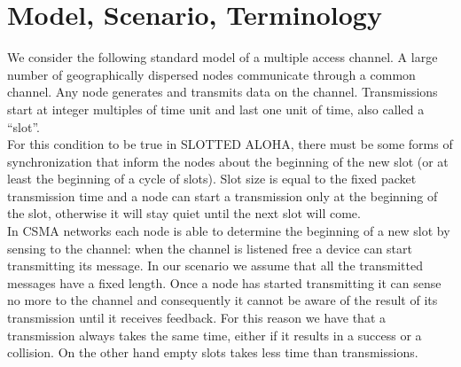 \documentclass[12pt,a4paper]{report}
\begin{document}

\section{Model, Scenario, Terminology}

We consider the following standard model of a multiple access channel. A large number of geographically dispersed nodes communicate through a common channel. Any node generates and transmits data on the channel. Transmissions start at integer multiples of  time unit and last one unit of time, also called a ``slot''.\\

For this condition to be true in SLOTTED ALOHA, there must be some forms of synchronization that inform the nodes about the beginning of the new slot (or at least the beginning of a cycle of slots). Slot size is equal to the fixed packet transmission time and a node can start a transmission only at the beginning of the slot, otherwise it will stay quiet until the next slot will come.\\

In CSMA networks each node is able to determine the beginning of a new slot by sensing to the channel: when the channel is listened free a device can start transmitting its message. In our scenario we assume that all the transmitted messages have a fixed length. Once a node has started transmitting it can sense no more to the channel and consequently it cannot be aware of the result of its transmission until it receives feedback. For this reason we have that a transmission always takes the same time, either if  it results in a success or a collision. On the other hand empty slots takes less time than transmissions.\\
\end{document}
